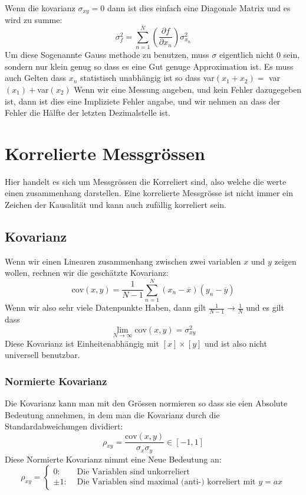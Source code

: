 \documentclass{article}
\begin{document}
Wenn die kovarianz $\sigma_{xy}=0$ dann ist dies einfach eine Diagonale Matrix und es wird zu summe:
\[\sigma_f^2=\sum_{n=1}^N\left(\frac{\partial f}{\partial x_n}\right)\sigma_{x_n}^2\]
Um diese Sogenannte Gauss methode zu benutzen, muss $\sigma$ eigentlich nicht $0$ sein, sondern nur klein genug so dass es eine Gut genuge Approximation ist. Es muss auch Gelten dass $x_n$ statistisch unabhängig ist so dass \newline var$(x_1+x_2)=$ var$(x_1)+$var$(x_2)$
\newline Wenn wir eine Messung angeben, und kein Fehler dazugegeben ist, dann ist dies eine Impliziete Fehler angabe, und wir nehmen an dass der Fehler die Hälfte der letzten Dezimalstelle ist.
\section*{Korrelierte Messgrössen}
Hier handelt es sich um Messgrössen die Korreliert sind, also welche die werte einen zusammenhang darstellen. Eine korrelierte 
Messgrösse ist nicht immer ein Zeichen der Kausalität und kann auch zufällig korreliert sein.
\hypertarget{kovarianz}{\subsection*{Kovarianz}} Wenn wir einen Linearen zusammenhang zwischen zwei variablen $x$ und $y$ zeigen wollen, rechnen wir die geschätzte Kovarianz:
\[\text{cov}(x,y)=\frac{1}{N-1}\sum_{n=1}^{N}(x_n-\overline{x})(y_n-\overline{y})\]
Wenn wir also sehr viele Datenpunkte Haben, dann gilt $\frac{1}{N-1}\rightarrow \frac{1}{N}$ und es gilt dass \[\lim_{N\rightarrow\infty} \text{cov}(x,y)=\sigma_{xy}^2\]
Diese Kovarianz ist Einheitenabhängig mit $[x]\times [y]$ und ist also nicht universell benutzbar.
\hypertarget{normiertekovarianz}{\subsubsection*{Normierte Kovarianz}} Die Kovarianz kann man mit den Grössen normieren so dass sie eien Absolute Bedeutung annehmen, in dem man die Kovarianz durch die Standardabweichungen dividiert:\[\rho_{xy}=\frac{\text{cov}(x,y)}{\sigma_x\sigma_y}\in [-1,1]\]
Diese Normierte Kovarianz nimmt eine Neue Bedeutung an:
\[\rho_{xy}=\left\lbrace \begin{matrix}0:&\text{ Die Variablen sind unkorreliert}\\ \pm1: & \text{ Die Variablen sind maximal (anti-) korreliert mit }y=ax\end{matrix}\right.\]
\end{document}
